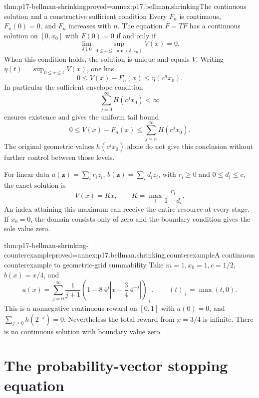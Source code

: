 \begin{hbtheorem}{thm:p17-bellman-shrinking}{proved=annex:p17.bellman.shrinking}{The continuous solution and a constructive sufficient condition}
Every \(F_n\) is continuous, \(F_n(0)=0\), and \(F_n\)
increases with \(n\). The equation \(F=TF\) has a continuous
solution on \([0,x_0]\) with \(F(0)=0\) if and only if
\[
             \lim_{\delta\downarrow0}
                    \sup_{0\leq x\leq\min(\delta,x_0)}V(x)=0.
\]
When this condition holds, the solution is unique and equals \(V\).
Writing \(\eta(t)=\sup_{0\leq x\leq t}V(x)\), one has
\[
                 0\leq V(x)-F_n(x)\leq\eta(c^n x_0).
\]
In particular the sufficient envelope condition
\[
                           \sum_{j=0}^{\infty}H(c^j x_0)<\infty
\]
ensures existence and gives the uniform tail bound
\[
          0\leq V(x)-F_n(x)
                          \leq\sum_{j=n}^{\infty}H(c^j x_0).
\]
The original geometric values \(h(c^j x_0)\) alone do not
give this conclusion without further control between those levels.

For linear data \(a(\mathbf z)=\sum_i r_i z_i\),
\(b(\mathbf z)=\sum_i d_i z_i\), with \(r_i\geq0\) and
\(0\leq d_i\leq c\), the exact solution is
\[
                     V(x)=Kx,\qquad
                     K=\max_i\frac{r_i}{1-d_i}.
\]
An index attaining this maximum can receive the entire
resource at every stage. If \(x_0=0\), the domain consists
only of zero and the boundary condition gives the sole value zero.
\end{hbtheorem}

\begin{hbtheorem}{thm:p17-bellman-shrinking-counterexample}{proved=annex:p17.bellman.shrinking.counterexample}{A continuous counterexample to geometric-grid summability}
Take \(m=1,x_0=1,c=1/2\), \(b(x)=x/4\), and
\[
 a(x)=\sum_{j=0}^{\infty}\frac1{j+1}
       \left(1-8\,4^j\left|x-\frac34\,4^{-j}\right|\right)_+,
             \qquad (t)_+=\max(t,0).
\]
This is a nonnegative continuous reward on \([0,1]\)
with \(a(0)=0\), and
\(\sum_{j\geq0}h(2^{-j})=0\).
Nevertheless the total reward from \(x=3/4\) is infinite.
There is no continuous solution with boundary value zero.
\end{hbtheorem}

\section{The probability-vector stopping equation}

